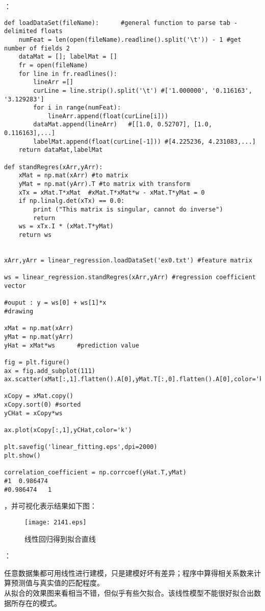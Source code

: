 ：
\begin{lstlisting}
def loadDataSet(fileName):      #general function to parse tab -delimited floats
    numFeat = len(open(fileName).readline().split('\t')) - 1 #get number of fields 2
    dataMat = []; labelMat = []
    fr = open(fileName)
    for line in fr.readlines():
        lineArr =[]
        curLine = line.strip().split('\t') #['1.000000', '0.116163', '3.129283']
        for i in range(numFeat):
            lineArr.append(float(curLine[i]))
        dataMat.append(lineArr)   #[[1.0, 0.52707], [1.0, 0.116163],...]
        labelMat.append(float(curLine[-1])) #[4.225236, 4.231083,...]
    return dataMat,labelMat

def standRegres(xArr,yArr):
    xMat = np.mat(xArr) #to matrix
    yMat = np.mat(yArr).T #to matrix with transform
    xTx = xMat.T*xMat  #xMat.T*xMat*w - xMat.T*yMat = 0
    if np.linalg.det(xTx) == 0.0:
        print ("This matrix is singular, cannot do inverse")
        return
    ws = xTx.I * (xMat.T*yMat)
    return ws


xArr,yArr = linear_regression.loadDataSet('ex0.txt') #feature matrix

ws = linear_regression.standRegres(xArr,yArr) #regression coefficient vector

#ouput : y = ws[0] + ws[1]*x
#drawing

xMat = np.mat(xArr)
yMat = np.mat(yArr)
yHat = xMat*ws      #prediction value

fig = plt.figure()
ax = fig.add_subplot(111)
ax.scatter(xMat[:,1].flatten().A[0],yMat.T[:,0].flatten().A[0],color='k')

xCopy = xMat.copy()
xCopy.sort(0) #sorted
yCHat = xCopy*ws

ax.plot(xCopy[:,1],yCHat,color='k')

plt.savefig('linear_fitting.eps',dpi=2000)
plt.show()

correlation_coefficient = np.corrcoef(yHat.T,yMat)
#1	0.986474
#0.986474	1
\end{lstlisting}

，并可视化表示结果如下图：
\begin{figure}[!htb]
  \centering
  \texttt{[image: 2141.eps]}
  \caption{线性回归得到拟合直线}
\end{figure}

：\par
任意数据集都可用线性进行建模，只是建模好坏有差异；程序中算得相关系数来计算预测值与真实值的匹配程度。\\
从拟合的效果图来看相当不错，但似乎有些欠拟合。该线性模型不能很好拟合出数据所存在的模式。

